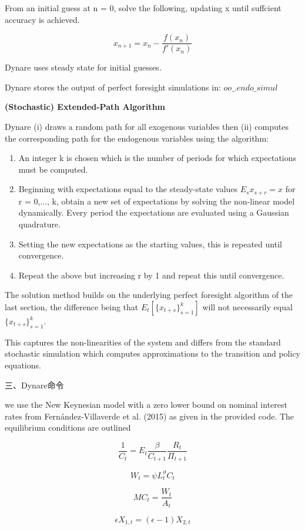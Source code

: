 \documentclass[cn,10pt,math=newtx,citestyle=gb7714-2015,bibstyle=gb7714-2015]{elegantbook}
\begin{document}
From an initial guess at n = 0, solve the following, updating x until suffcient accuracy is achieved.

$$x_{n+1}=x_n-\frac{f(x_n)}{f'(x_n)}$$

Dynare uses steady state for initial guesses.

Dynare stores the output of perfect foresight simulations in: $oo\_.endo\_simul$

\textbf{(Stochastic) Extended-Path Algorithm}

Dynare (i) draws a random path for all exogenous variables then (ii) computes the corresponding path for the endogenous variables using the algorithm:

\begin{enumerate}
	\item An integer k is chosen which is the number of periods for which expectations must be computed.
	\item Beginning with expectations equal to the steady-state values $E_sx_{s+r} = x$ for r = 0,..., k, obtain a new set of expectations by solving the non-linear model dynamically. Every period the expectations are evaluated using a Gaussian quadrature.
	\item Setting the new expectations as the starting values, this is repeated until convergence.
	\item Repeat the above but increasing r by 1 and repeat this until convergence.
\end{enumerate}

The solution method builds on the underlying perfect foresight algorithm of the last section, the difference being that $E_t\left[\{x_{t+s}\}_{s=1}^k\right]$ will not necessarily equal $\{x_{t+s}\}_{s=1}^k$.

This captures the non-linearities of the system and differs from the standard stochastic simulation which computes approximations to the transition and policy equations.

三、Dynare命令

we use the New Keynesian model with a zero lower bound on nominal interest rates from Fernández-Villaverde et al. (2015) as given in the provided code. The equilibrium conditions are outlined

$$\frac{1}{C_t}=E_t\frac{\beta}{C_{t+1}}\frac{R_t}{\Pi_{t+1}}$$

$$W_t=\psi L_t^{\vartheta}C_t$$

$$MC_t=\frac{W_t}{A_t}$$

$$\epsilon X_{1,t}=(\epsilon-1)X_{2,t}$$
\end{document}
